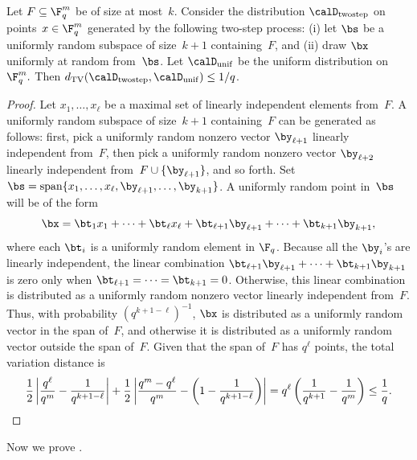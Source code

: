 \documentclass[11pt]{article}
\begin{document}
\begin{proposition}\label{prop:almost-uniform}
Let $F \subseteq \F_q^m$ be of size at most~$k$. Consider the distribution $\calD_{\mathrm{twostep}}$ on points~$x\in\F_q^m$ generated by the following two-step process:
(i) let $\bs$ be a uniformly random subspace of size~$k+1$ containing~$F$, and (ii) draw $\bx$ uniformly at random from~$\bs$.
Let $\calD_{\mathrm{unif}}$ be the uniform distribution on~$\F_q^m.$
Then $d_\mathrm{TV}(\calD_{\mathrm{twostep}}, \calD_{\mathrm{unif}}) \leq 1/q$.
\end{proposition}
\begin{proof}
Let $x_1, \ldots, x_\ell$ be a maximal set of linearly independent elements from~$F$.
A uniformly random subspace of size~$k+1$ containing~$F$ can be generated as follows:
first, pick a uniformly random nonzero vector $\by_{\ell+1}$ linearly independent from~$F$,
then pick a uniformly random nonzero vector $\by_{\ell+2}$ linearly independent from~$F\cup\{\by_{\ell+1}\}$,
and so forth. Set $\bs = \mathrm{span}\{x_1, \ldots, x_\ell, \by_{\ell+1}, \ldots, \by_{k+1}\}$.
A uniformly random point in~$\bs$ will be of the form 
\begin{equation*}
\bx = \bt_1 x_1 + \cdots + \bt_\ell x_\ell + \bt_{\ell+1} \by_{\ell+1} + \cdots + \bt_{k+1} \by_{k+1},
\end{equation*}
where each $\bt_{i}$ is a uniformly random element in $\F_q$.
Because all the $\by_i$'s are linearly independent,
the linear combination $\bt_{\ell+1} \by_{\ell+1} + \cdots + \bt_{k+1} \by_{k+1}$
is zero only when $\bt_{\ell+1} = \cdots = \bt_{k+1} = 0$.
Otherwise, this linear combination is distributed as a uniformly random nonzero vector linearly independent from~$F$.
Thus, with probability $(q^{k+1-\ell})^{-1}$, $\bx$ is distributed as a uniformly random vector in the span of~$F$,
and otherwise it is distributed as a uniformly random vector outside the span of~$F$.
Given that the span of~$F$ has $q^{\ell}$ points, the total variation distance is
\begin{equation*}
\frac{1}{2} \left| \frac{q^{\ell}}{q^m} - \frac{1}{q^{k+1-\ell}}\right|
+ \frac{1}{2} \left| \frac{q^m- q^{\ell}}{q^m} - \left(1- \frac{1}{q^{k+1-\ell}}\right)\right|
= q^{\ell}\left(\frac{1}{q^{k+1}} - \frac{1}{q^m}\right)
\leq \frac{1}{q}.\qedhere
\end{equation*}
\end{proof}

Now we prove .
\end{document}
